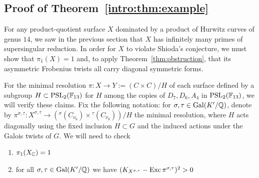 \documentclass[main.tex]{subfiles}
\begin{document}
\subsection{Proof of Theorem~\ref{intro:thm:example}}

For any product-quotient surface $X$ dominated by a product of Hurwitz curves of genus $14$, we saw in the previous section that $X$ has infinitely many primes of supersingular reduction. 
In order for $X$ to violate Shioda's conjecture, we must show that $\pi_1(X) = 1$ and, to apply Theorem~\ref{thm:obstruction}, that its asymmetric Frobenius twists all carry diagonal symmetric forms.
\par 
For the minimal resolution $\pi : X \to Y := (C \times C)/H$ of each surface defined by a subgroup $H \subset \mathrm{PSL}_2(\mathbb{F}_{13})$ for $H$ among the copies of $D_7, D_6, A_4$ in $\mathrm{PSL}_2(\mathbb{F}_{13})$, we will verify these claims. Fix the following notation: for $\sigma, \tau \in \operatorname{\mathrm{Gal}}(K'/\mathbb{Q})$, denote by $\pi^{\sigma, \tau} : X^{\sigma, \tau} \to ({}^{\sigma}(C_{\nu_0}) \times {}^{\tau} (C_{\nu_0})) / H$ the minimal resolution, where $H$ acts diagonally using the fixed inclusion $H \subset G$ and the induced actions under the Galois twists of $G$. We will need to check
\begin{enumerate}
    \item $\pi_1(X_{\mathbb{C}}) = 1$
    \item for all $\sigma, \tau \in \operatorname{\mathrm{Gal}}(K'/\mathbb{Q})$ we have $(K_{X^{\sigma, \tau}} - \operatorname{\mathrm{Exc}}{\pi^{\sigma, \tau}})^2 > 0$
\end{enumerate}
\end{document}
